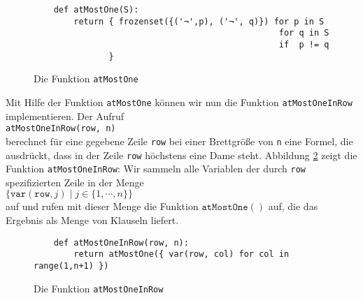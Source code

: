 \begin{figure}[!ht]
  \centering
\begin{verbatim}
    def atMostOne(S): 
        return { frozenset({('¬',p), ('¬', q)}) for p in S
                                                 for q in S 
                                                 if  p != q 
               }
\end{verbatim}
\vspace*{-0.3cm}
  \caption{Die Funktion \texttt{atMostOne}}
  \label{fig:atMostOne}
\end{figure}

Mit Hilfe der Funktion \texttt{atMostOne} können wir nun die Funktion
\texttt{atMostOneInRow} implementieren.  Der Aufruf \\[0.2cm]
\hspace*{1.3cm} 
\texttt{atMostOneInRow(row, n)} \\[0.2cm]
berechnet für eine gegebene Zeile \texttt{row} bei einer Brettgröße von \texttt{n} eine Formel,
die ausdrückt, dass in der Zeile \texttt{row} höchstens eine Dame steht.
Abbildung \ref{fig:atMostOneInRow} zeigt die
Funktion \texttt{atMostOneInRow}: Wir sammeln alle Variablen der durch \texttt{row}
spezifizierten Zeile
in der Menge 
\\[0.2cm]
\hspace*{1.3cm}
$\bigl\{ \texttt{var}(\texttt{row},j) \mid j \in \{1, \cdots, n \} \bigr\}$
\\[0.2cm]
 auf und rufen mit dieser Menge die Funktion $\texttt{atMostOne}()$ auf, die das Ergebnis
als Menge von Klauseln liefert.

\begin{figure}[!ht]
  \centering
\begin{verbatim}
    def atMostOneInRow(row, n):
        return atMostOne({ var(row, col) for col in range(1,n+1) })
\end{verbatim}
\vspace*{-0.3cm}
  \caption{Die Funktion \texttt{atMostOneInRow}}
  \label{fig:atMostOneInRow}
\end{figure}

